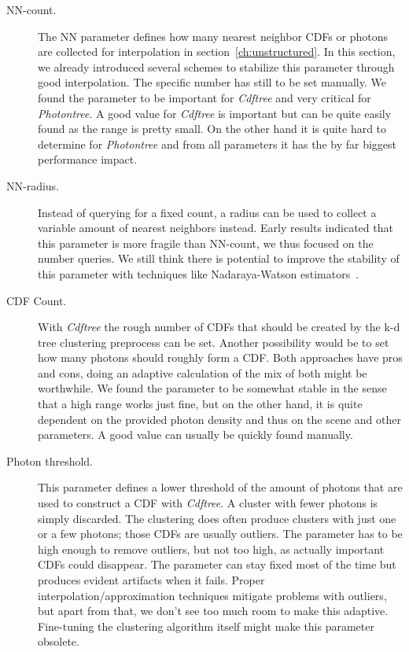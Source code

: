 \begin{description}
    \item[NN-count.] The NN parameter defines how many nearest neighbor CDFs or photons are collected for interpolation in section~\ref{ch:unstructured}. In this section, we already introduced several schemes to stabilize this parameter through good interpolation. The specific number has still to be set manually. We found the parameter to be important for \textit{Cdftree} and very critical for \textit{Photontree}. A good value for \textit{Cdftree} is important but can be quite easily found as the range is pretty small. On the other hand it is quite hard to determine for \textit{Photontree} and from all parameters it has the by far biggest performance impact.
    \item[NN-radius.] Instead of querying for a fixed count, a radius can be used to collect a variable amount of nearest neighbors instead. Early results indicated that this parameter is more fragile than NN-count, we thus focused on the number queries. We still think there is potential to improve the stability of this parameter with techniques like Nadaraya-Watson estimators~\parencite{nadaraya1964estimating}.
    \item[CDF Count.] With \textit{Cdftree} the rough number of CDFs that should be created by the k-d tree clustering preprocess can be set. Another possibility would be to set how many photons should roughly form a CDF. Both approaches have pros and cons, doing an adaptive calculation of the mix of both might be worthwhile. We found the parameter to be somewhat stable in the sense that a high range works just fine, but on the other hand, it is quite dependent on the provided photon density and thus on the scene and other parameters. A good value can usually be quickly found manually.
    \item[Photon threshold.] This parameter defines a lower threshold of the amount of photons that are used to construct a CDF with \textit{Cdftree}. A cluster with fewer photons is simply discarded. The clustering does often produce clusters with just one or a few photons; those CDFs are usually outliers. The parameter has to be high enough to remove outliers, but not too high, as actually important CDFs could disappear. The parameter can stay fixed most of the time but produces evident artifacts when it fails. Proper interpolation/approximation techniques mitigate problems with outliers, but apart from that, we don't see too much room to make this adaptive. Fine-tuning the clustering algorithm itself might make this parameter obsolete.
    
\end{description}

